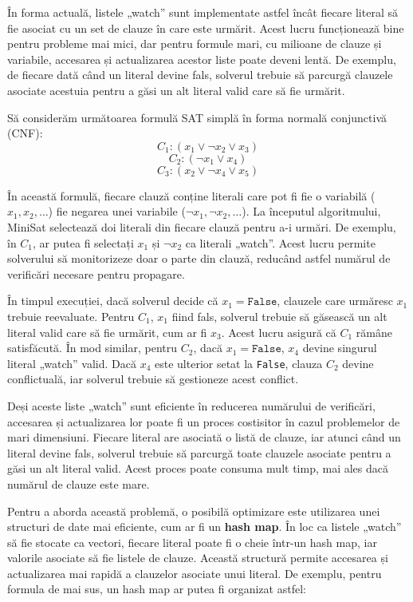 \documentclass[runningheads]{llncs}
\begin{document}
În forma actuală, listele „watch” sunt implementate astfel încât fiecare literal să fie asociat cu un set de clauze în care este urmărit. Acest lucru funcționează bine pentru probleme mai mici, dar pentru formule mari, cu milioane de clauze și variabile, accesarea și actualizarea acestor liste poate deveni lentă. 
De exemplu, de fiecare dată când un literal devine fals, solverul trebuie să parcurgă clauzele asociate acestuia pentru a găsi un alt literal valid care să fie urmărit.

Să considerăm următoarea formulă SAT simplă în forma normală conjunctivă (CNF):
\[
C_1: (x_1 \lor \neg x_2 \lor x_3)
\]
\[
C_2: (\neg x_1 \lor x_4)
\]
\[
C_3: (x_2 \lor \neg x_4 \lor x_5)
\]

În această formulă, fiecare clauză conține literali care pot fi fie o variabilă (\(x_1, x_2, \dots\)) fie negarea unei variabile (\(\neg x_1, \neg x_2, \dots\)). La începutul algoritmului, MiniSat selectează doi literali din fiecare clauză pentru a-i urmări. De exemplu, în \(C_1\), ar putea fi selectați \(x_1\) și \(\neg x_2\) ca literali „watch”. Acest lucru permite solverului să monitorizeze doar o parte din clauză, reducând astfel numărul de verificări necesare pentru propagare.

În timpul execuției, dacă solverul decide că \(x_1 = \texttt{False}\), clauzele care urmăresc \(x_1\) trebuie reevaluate. Pentru \(C_1\), \(x_1\) fiind fals, solverul trebuie să găsească un alt literal valid care să fie urmărit, cum ar fi \(x_3\). Acest lucru asigură că \(C_1\) rămâne satisfăcută. În mod similar, pentru \(C_2\), dacă \(x_1 = \texttt{False}\), \(x_4\) devine singurul literal „watch” valid. Dacă \(x_4\) este ulterior setat la \texttt{False}, clauza \(C_2\) devine conflictuală, iar solverul trebuie să gestioneze acest conflict.

Deși aceste liste „watch” sunt eficiente în reducerea numărului de verificări, accesarea și actualizarea lor poate fi un proces costisitor în cazul problemelor de mari dimensiuni. Fiecare literal are asociată o listă de clauze, iar atunci când un literal devine fals, solverul trebuie să parcurgă toate clauzele asociate pentru a găsi un alt literal valid. Acest proces poate consuma mult timp, mai ales dacă numărul de clauze este mare.

Pentru a aborda această problemă, o posibilă optimizare este utilizarea unei structuri de date mai eficiente, cum ar fi un \textbf{hash map}. În loc ca listele „watch” să fie stocate ca vectori, fiecare literal poate fi o cheie într-un hash map, iar valorile asociate să fie listele de clauze. Această structură permite accesarea și actualizarea mai rapidă a clauzelor asociate unui literal. De exemplu, pentru formula de mai sus, un hash map ar putea fi organizat astfel:
\end{document}
